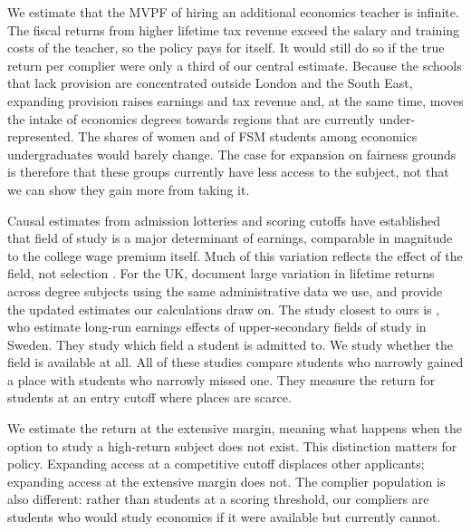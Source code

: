We estimate that the MVPF of hiring an additional economics teacher is infinite. The fiscal returns from higher lifetime tax revenue exceed the salary and training costs of the teacher, so the policy pays for itself. It would still do so if the true return per complier were only a third of our central estimate. Because the schools that lack provision are concentrated outside London and the South East, expanding provision raises earnings and tax revenue and, at the same time, moves the intake of economics degrees towards regions that are currently under-represented. The shares of women and of FSM students among economics undergraduates would barely change. The case for expansion on fairness grounds is therefore that these groups currently have less access to the subject, not that we can show they gain more from taking it.


Causal estimates from admission lotteries and scoring cutoffs have established that field of study is a major determinant of earnings, comparable in magnitude to the college wage premium itself. Much of this variation reflects the effect of the field, not selection \citep{kirkeboen2016field,bleemer2022college,hastings2013cutoffs}. For the UK, \citet{britton2020degrees} document large variation in lifetime returns across degree subjects using the same administrative data we use, and \citet{britton2026lifetime} provide the updated estimates our calculations draw on. The study closest to ours is \citet{dahl2023highschool}, who estimate long-run earnings effects of upper-secondary fields of study in Sweden. They study which field a student is admitted to. We study whether the field is available at all. All of these studies compare students who narrowly gained a place with students who narrowly missed one. They measure the return for students at an entry cutoff where places are scarce.

We estimate the return at the extensive margin, meaning what happens when the option to study a high-return subject does not exist. This distinction matters for policy. Expanding access at a competitive cutoff displaces other applicants; expanding access at the extensive margin does not. The complier population is also different: rather than students at a scoring threshold, our compliers are students who would study economics if it were available but currently cannot.

